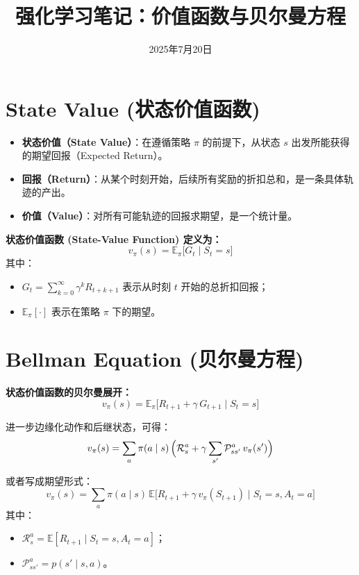 \documentclass[a4paper]{article}
\begin{document}
\title{强化学习笔记：价值函数与贝尔曼方程}
\author{} %
\date{2025年7月20日}
\maketitle

\section{State Value (状态价值函数)}

\begin{itemize}
    \item \textbf{状态价值（State Value）}：在遵循策略 $\pi$ 的前提下，从状态 $s$ 出发所能获得的期望回报（Expected Return）。
    \item \textbf{回报（Return）}：从某个时刻开始，后续所有奖励的折扣总和，是一条具体轨迹的产出。
    \item \textbf{价值（Value）}：对所有可能轨迹的回报求期望，是一个统计量。
\end{itemize}

\textbf{状态价值函数 (State-Value Function) 定义为：}
\begin{equation*}
v_\pi(s) = \mathbb{E}_\pi \bigl[G_t \mid S_t = s\bigr]
\end{equation*}
其中：
\begin{itemize}
    \item $G_t = \displaystyle\sum_{k=0}^\infty \gamma^k R_{t+k+1}$ 表示从时刻 $t$ 开始的总折扣回报；
    \item $\mathbb{E}_\pi[\cdot]$ 表示在策略 $\pi$ 下的期望。
\end{itemize}

\hrulefill

\section{Bellman Equation (贝尔曼方程)}

\textbf{状态价值函数的贝尔曼展开：}
\begin{equation*}
v_\pi(s) = \mathbb{E}_\pi \bigl[R_{t+1} + \gamma\,G_{t+1} \mid S_t = s\bigr]
\end{equation*}

进一步边缘化动作和后继状态，可得：
\begin{equation*}
v_\pi(s) = \sum_a \pi(a \mid s)\,\Bigl(\mathcal{R}_s^a + \gamma \sum_{s'} \mathcal{P}_{ss'}^a\,v_\pi(s')\Bigr)
\end{equation*}

或者写成期望形式：
\begin{equation*}
v_\pi(s) = \sum_a \pi(a \mid s)\,\mathbb{E}\bigl[R_{t+1} + \gamma\,v_\pi(S_{t+1}) \mid S_t = s, A_t = a\bigr]
\end{equation*}
其中：
\begin{itemize}
    \item $\mathcal{R}_s^a = \mathbb{E}[R_{t+1} \mid S_t = s, A_t = a]$；
    \item $\mathcal{P}_{ss'}^a = p(s' \mid s, a)$。
\end{itemize}
\end{document}
